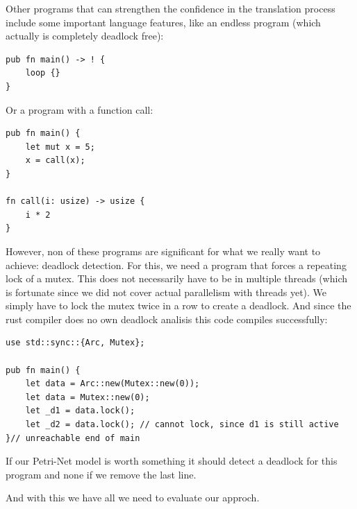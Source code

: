 Other programs that can strengthen the confidence in the translation process include some important language features, like an endless program (which actually is completely deadlock free):

\begin{lstlisting}
pub fn main() -> ! {
    loop {}
}
\end{lstlisting}
Or a program with a function call:

\begin{lstlisting}
pub fn main() {
    let mut x = 5;
    x = call(x);
}

fn call(i: usize) -> usize {
    i * 2
}
\end{lstlisting}

However, non of these programs are significant for what we really want to achieve: deadlock detection.
For this, we need a program that forces a repeating lock of a mutex.
This does not necessarily have to be in multiple threads
(which is fortunate since we did not cover actual parallelism with threads yet).
We simply have to lock the mutex twice in a row to create a deadlock.
And since the rust compiler does no own deadlock analisis this code compiles successfully:

\begin{lstlisting}
use std::sync::{Arc, Mutex};

pub fn main() {
    let data = Arc::new(Mutex::new(0));
    let data = Mutex::new(0);
    let _d1 = data.lock();
    let _d2 = data.lock(); // cannot lock, since d1 is still active
}// unreachable end of main
\end{lstlisting}
If our Petri-Net model is worth something it should detect a deadlock for this program and none if we remove the last line.

And with this we have all we need to evaluate our approch.

